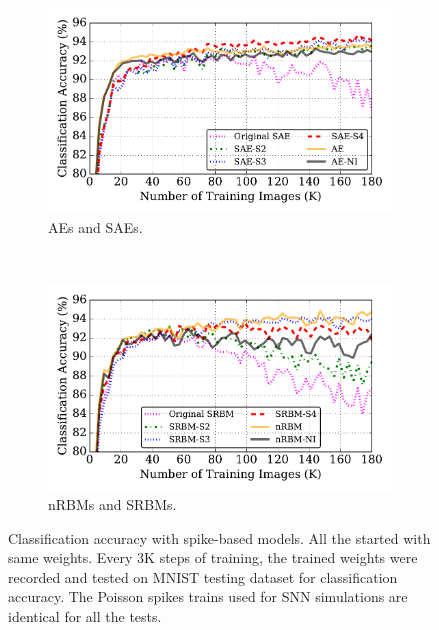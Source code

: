 \begin{figure}
	\centering
	\begin{subfigure}[t]{0.8\textwidth}
		\includegraphics[width=\textwidth]{pics_sdlm/43_MNIST_SAE_all/compare_result.pdf}
		\caption{AEs and SAEs.}
	\end{subfigure}\\
	\begin{subfigure}[t]{0.8\textwidth}
		\includegraphics[width=\textwidth]{pics_sdlm/53_MNIST_SRBM_all/compare_result.pdf}
		\caption{nRBMs and SRBMs.}
	\end{subfigure}
	\caption{Classification accuracy \DIFdelbeginFL {}\DIFdelendFL \DIFaddbeginFL {}\DIFaddendFL with \DIFdelbeginFL {}\DIFdelendFL spike-based models. All the \DIFdelbeginFL {}\DIFdelendFL \DIFaddbeginFL {}\DIFaddendFL started with same \DIFaddbeginFL {}\DIFaddendFL weights\DIFdelbeginFL {}\DIFdelendFL . Every 3K steps of training, the trained weights were recorded and tested on \DIFaddbeginFL {}\DIFaddendFL MNIST testing dataset for classification accuracy. The Poisson spikes trains used for SNN simulations are identical for all the tests.}
	\label{fig:sdlm_ca}
\end{figure}
